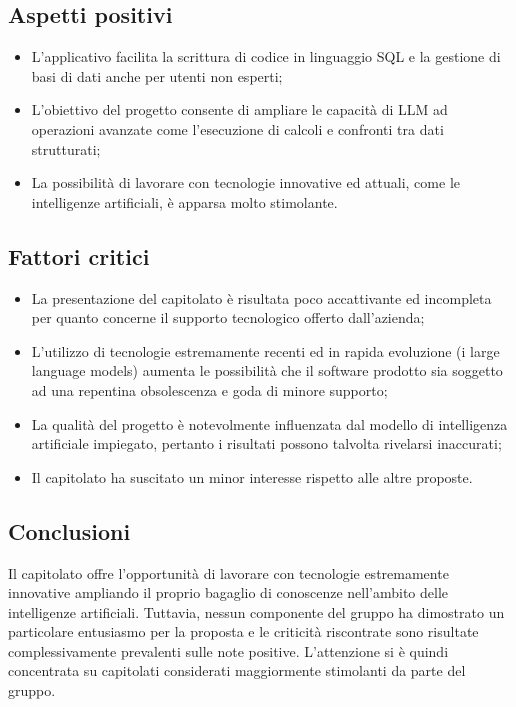 \subsection{Aspetti positivi}
\begin{itemize}
    \setlength\itemsep{0em}
    \item L'applicativo facilita la scrittura di codice in linguaggio SQL e la gestione di basi di dati anche per utenti non esperti;
    \item L'obiettivo del progetto consente di ampliare le capacità di LLM ad operazioni avanzate come l'esecuzione di calcoli e confronti tra dati strutturati;
    \item La possibilità di lavorare con tecnologie innovative ed attuali, come le intelligenze artificiali, è apparsa molto stimolante.
\end{itemize}

\subsection{Fattori critici}
\begin{itemize}
    \setlength\itemsep{0em}
    \item La presentazione del capitolato è risultata poco accattivante ed incompleta per quanto concerne il supporto tecnologico offerto dall'azienda;
    \item L'utilizzo di tecnologie estremamente recenti ed in rapida evoluzione (i large language models) aumenta le possibilità che il software prodotto sia soggetto ad una repentina obsolescenza e goda di minore supporto;
    \item La qualità del progetto è notevolmente influenzata dal modello di intelligenza artificiale impiegato, pertanto i risultati possono talvolta rivelarsi inaccurati;
    \item Il capitolato ha suscitato un minor interesse rispetto alle altre proposte.
\end{itemize}

\subsection{Conclusioni}
Il capitolato offre l'opportunità di lavorare con tecnologie estremamente innovative ampliando il proprio bagaglio di conoscenze nell'ambito delle intelligenze artificiali. Tuttavia, nessun componente del gruppo ha dimostrato un particolare entusiasmo per la proposta e le criticità riscontrate sono risultate complessivamente prevalenti sulle note positive. L'attenzione si è quindi concentrata su capitolati considerati maggiormente stimolanti da parte del gruppo.
